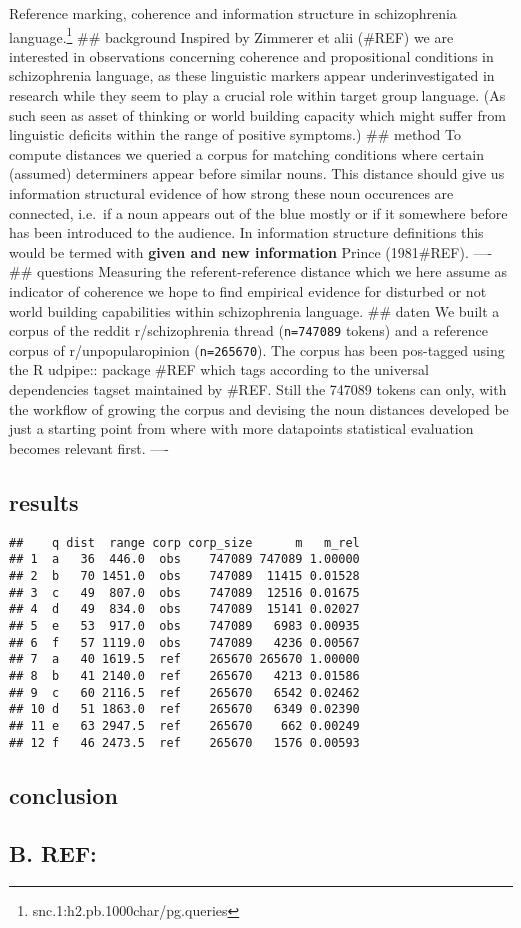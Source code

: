 \documentclass[]{tufte-handout}
\begin{document}
Reference marking, coherence and information structure in schizophrenia
language.\footnote{snc.1:h2.pb.1000char/pg.queries} \#\# background
Inspired by Zimmerer et alii (\#REF) we are interested in observations
concerning coherence and propositional conditions in schizophrenia
language, as these linguistic markers appear underinvestigated in
research while they seem to play a crucial role within target group
language. (As such seen as asset of thinking or world building capacity
which might suffer from linguistic deficits within the range of positive
symptoms.) \#\# method To compute distances we queried a corpus for
matching conditions where certain (assumed) determiners appear before
similar nouns. This distance should give us information structural
evidence of how strong these noun occurences are connected, i.e.~if a
noun appears out of the blue mostly or if it somewhere before has been
introduced to the audience. In information structure definitions this
would be termed with \textbf{given and new information} Prince
(1981\#REF). ---- \#\# questions Measuring the referent-reference
distance which we here assume as indicator of coherence we hope to find
empirical evidence for disturbed or not world building capabilities
within schizophrenia language. \#\# daten We built a corpus of the
reddit r/schizophrenia thread (\texttt{n=747089} tokens) and a reference
corpus of r/unpopularopinion (\texttt{n=265670}). The corpus has been
pos-tagged using the R udpipe:: package \#REF which tags according to
the universal dependencies tagset maintained by \#REF. Still the 747089
tokens can only, with the workflow of growing the corpus and devising
the noun distances developed be just a starting point from where with
more datapoints statistical evaluation becomes relevant first. ----

\subsection{results}\label{results}

\begin{verbatim}
##    q dist  range corp corp_size      m   m_rel
## 1  a   36  446.0  obs    747089 747089 1.00000
## 2  b   70 1451.0  obs    747089  11415 0.01528
## 3  c   49  807.0  obs    747089  12516 0.01675
## 4  d   49  834.0  obs    747089  15141 0.02027
## 5  e   53  917.0  obs    747089   6983 0.00935
## 6  f   57 1119.0  obs    747089   4236 0.00567
## 7  a   40 1619.5  ref    265670 265670 1.00000
## 8  b   41 2140.0  ref    265670   4213 0.01586
## 9  c   60 2116.5  ref    265670   6542 0.02462
## 10 d   51 1863.0  ref    265670   6349 0.02390
## 11 e   63 2947.5  ref    265670    662 0.00249
## 12 f   46 2473.5  ref    265670   1576 0.00593
\end{verbatim}

\subsection{}\label{section}

\subsection{conclusion}\label{conclusion}

\subsection{B. REF:}\label{b.-ref}


\end{document}
